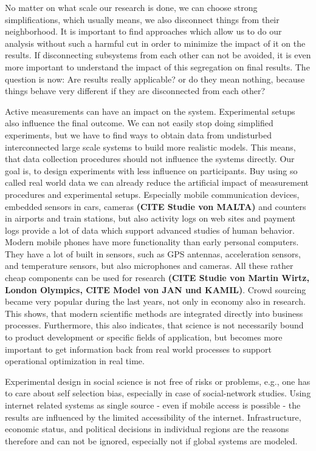 \documentclass[a4paper,10pt]{scrbook}
\begin{document}
No matter on what scale our research is done, we can choose strong simplifications, which usually means, we also disconnect things from their neighborhood. It is important to find approaches which allow us to do our analysis without such a harmful cut in order to minimize the impact of it on the results. If disconnecting subsystems from each other can not be avoided, it is even more important to understand the impact of this segregation on final results. The question is now: Are results really applicable? or do they mean nothing, because things behave very different if they are disconnected from each other?

Active measurements can have an impact on the system. Experimental setups also influence the final outcome. We can not easily stop doing simplified experiments, but we have to find ways to obtain data from undisturbed interconnected large scale systems to build more realistic models. This means, that data collection procedures should not influence the systems directly. Our goal is, to design experiments with less influence on  participants. Buy using so called real world data we can already reduce the artificial impact of measurement procedures and experimental setups. Especially mobile communication devices, embedded sensors in cars, cameras \textbf{(CITE Studie von MALTA)} and counters in airports and train stations, but also activity logs on web sites and payment logs provide a lot of data which support advanced studies of human behavior. Modern mobile phones have more functionality than early personal computers. They have a lot of built in sensors, such as GPS antennas, acceleration sensors, and temperature sensors, but also microphones and cameras. All these rather cheap components can be used for research \textbf{(CITE Studie von Martin Wirtz, London Olympics, CITE Model von JAN und KAMIL)}. Crowd sourcing became very popular during the last years, not only in economy also in research. This shows, that modern scientific methods are integrated directly into business processes. Furthermore, this also indicates, that science is not necessarily bound to product development or specific fields of application, but becomes more important to get information back from real world processes to support operational optimization in real time. 

Experimental design in social science is not free of risks or problems, e.g., one has to care about self selection bias, especially in case of social-network studies. Using internet related systems as single source - even if mobile access is possible - the results are influenced by the limited accessibility of the internet. Infrastructure, economic status, and political decisions in individual regions are the reasons therefore and can not be ignored, especially not if global systems are modeled. 
\end{document}

